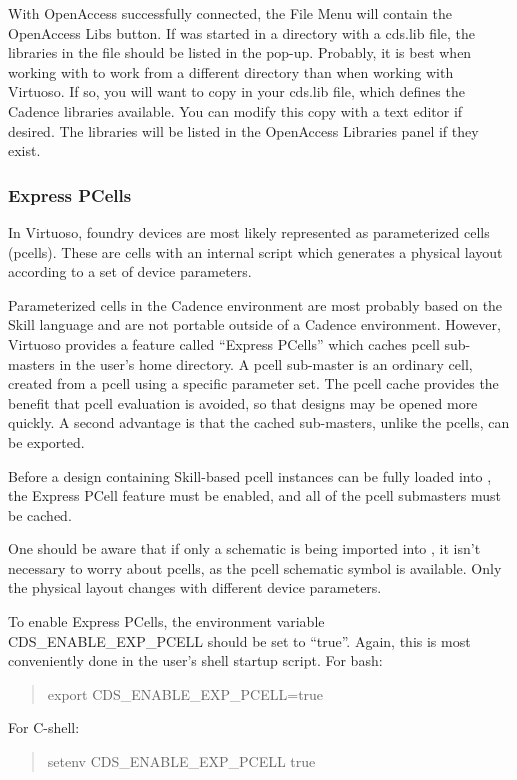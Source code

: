 With OpenAccess successfully connected, the {\cb File Menu} will
contain the {\cb OpenAccess Libs} button.  If {\Xic} was started in a
directory with a {\vt cds.lib} file, the libraries in the file should
be listed in the pop-up.  Probably, it is best when working with
{\Xic} to work from a different directory than when working with
Virtuoso.  If so, you will want to copy in your {\vt cds.lib} file,
which defines the Cadence libraries available.  You can modify this
copy with a text editor if desired.  The libraries will be listed in
the {\cb OpenAccess Libraries} panel if they exist.

\subsubsection{Express PCells}

In Virtuoso, foundry devices are most likely represented as
parameterized cells (pcells).  These are cells with an internal script
which generates a physical layout according to a set of device
parameters.

Parameterized cells in the Cadence environment are most probably based
on the Skill language and are not portable outside of a Cadence
environment.  However, Virtuoso provides a feature called ``Express
PCells'' which caches pcell sub-masters in the user's home directory. 
A pcell sub-master is an ordinary cell, created from a pcell using a
specific parameter set.  The pcell cache provides the benefit that
pcell evaluation is avoided, so that designs may be opened more
quickly.  A second advantage is that the cached sub-masters, unlike
the pcells, can be exported.

Before a design containing Skill-based pcell instances can be fully
loaded into {\Xic}, the Express PCell feature must be enabled, and all
of the pcell submasters must be cached.

One should be aware that if only a schematic is being imported into
{\Xic}, it isn't necessary to worry about pcells, as the pcell
schematic symbol is available.  Only the physical layout changes with
different device parameters.

To enable Express PCells, the environment variable
{\et CDS\_ENABLE\_EXP\_PCELL} should be set to ``{\vt true}''.
Again, this is most conveniently done in the user's shell
startup script.  For {\vt bash}:
\begin{quote}
\vt export CDS\_ENABLE\_EXP\_PCELL=true
\end{quote}
For C-shell:
\begin{quote}
\vt setenv CDS\_ENABLE\_EXP\_PCELL true
\end{quote}

